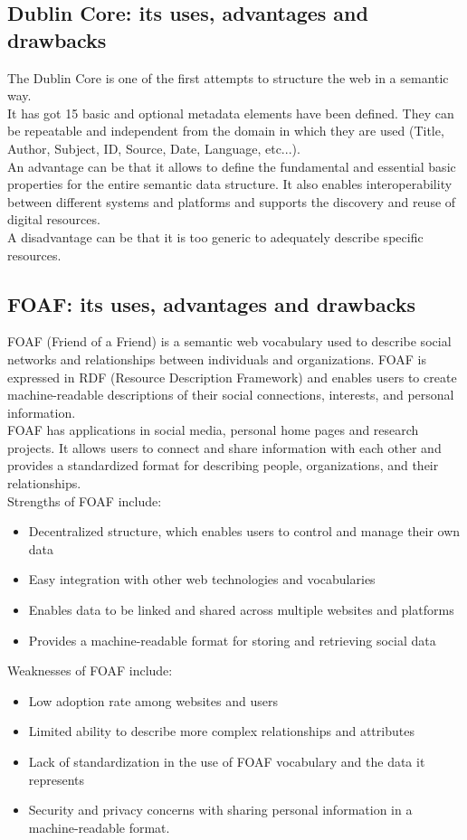 \newpage

\subsection{Dublin Core: its uses, advantages and drawbacks}
The Dublin Core is one of the first attempts to structure the web
in a semantic way.\\
It has got 15 basic and optional metadata elements have been defined.
They can be repeatable and independent from the domain in which they
are used (Title, Author, Subject, ID, Source, Date, Language, etc...).\\
An advantage can be that it allows to define the fundamental and
essential basic properties for the entire semantic data structure.
It also enables interoperability between different systems and platforms
and supports the discovery and reuse of digital resources.\\
A disadvantage can be that it is too generic to adequately describe
specific resources.

\subsection{FOAF: its uses, advantages and drawbacks}
FOAF (Friend of a Friend) is a semantic web vocabulary
used to describe social networks and relationships between individuals
and organizations. FOAF is expressed in RDF (Resource Description
Framework) and enables users to create machine-readable descriptions
of their social connections, interests, and personal information.\\
FOAF has applications in social media, personal home pages and
research projects. It allows users to connect and share information
with each other and provides a standardized format for describing
people, organizations, and their relationships.\\
Strengths of FOAF include:
\begin{itemize}
    \item Decentralized structure, which enables users to control and manage their own data
    \item Easy integration with other web technologies and vocabularies
    \item Enables data to be linked and shared across multiple websites
    and platforms
    \item Provides a machine-readable format for storing and retrieving
    social data
\end{itemize}
Weaknesses of FOAF include:
\begin{itemize}
    \item Low adoption rate among websites and users
    \item Limited ability to describe more complex relationships and
    attributes
    \item Lack of standardization in the use of FOAF vocabulary and
    the data it represents
    \item Security and privacy concerns with sharing personal
    information in a machine-readable format.
\end{itemize}

